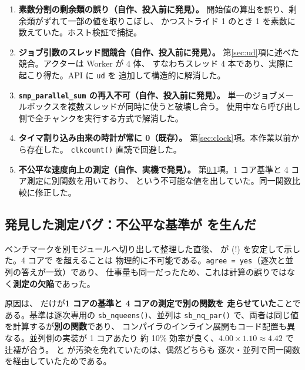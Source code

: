 \begin{enumerate}[leftmargin=1.6em]
  \item \textbf{素数分割の剰余類の誤り（自作、投入前に発見）。}
        開始値の算出を誤り、剰余類がずれて一部の値を取りこぼし、
        かつストライド 1 のとき 1 を素数に数えていた。ホスト検証で捕捉。

  \item \textbf{ジョブ引数のスレッド間競合（自作、投入前に発見）。}
        第\ref{sec:ud}項に述べた競合。アクターは Worker が 4 体、
        すなわちスレッド 4 本であり、実際に起こり得た。API に \texttt{ud} を
        追加して構造的に解消した。

  \item \textbf{\texttt{smp\_parallel\_sum} の再入不可（自作、投入前に発見）。}
        単一のジョブメールボックスを複数スレッドが同時に使うと破壊し合う。
        使用中なら呼び出し側で全チャンクを実行する方式で解消した。

  \item \textbf{タイマ割り込み由来の時計が常に 0（既存）。}
        第\ref{sec:clock}項。本作業以前から存在した。
        \texttt{clkcount()} 直読で回避した。

  \item \textbf{不公平な速度向上の測定（自作、実機で発見）。}
        第\ref{sec:rpi3-measbug}項。1 コア基準と 4 コア測定に別関数を用いており、
         という不可能な値を出していた。同一関数比較に修正した。
\end{enumerate}

\subsection{発見した測定バグ：不公平な基準が  を生んだ}
\label{sec:rpi3-measbug}

ベンチマークを別モジュールへ切り出して整理した直後、 が
\textbf{}(!) を安定して示した。4 コアで  を超えることは
物理的に不可能である。\texttt{agree = yes}（逐次と並列の答えが一致）であり、
仕事量も同一だったため、これは計算の誤りではなく\textbf{測定の欠陥}であった。

原因は、 だけが\textbf{1 コアの基準と 4 コアの測定で別の関数を
走らせていた}ことである。基準は逐次専用の \texttt{sb\_nqueens()}、並列は
\texttt{sb\_nq\_par()} で、両者は同じ値を計算するが\textbf{別の関数}であり、
コンパイラのインライン展開もコード配置も異なる。並列側の実装が 1 コアあたり
約 10\% 効率が良く、$4.00 \times 1.10 \approx 4.42$ で辻褄が合う。
 と  が汚染を免れていたのは、偶然どちらも
逐次・並列で同一関数を経由していたためである。

